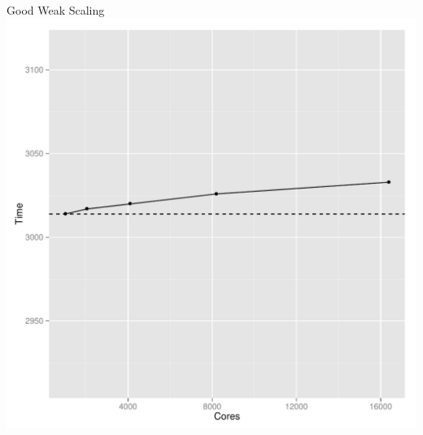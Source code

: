 \begin{frame}
\begin{center}
\begin{minipage}{.475\textwidth}
    \begin{block}{Good Weak Scaling}
      \centering
      \includegraphics[width=.95\textwidth]{../common/pics/scaling_weak}
    \end{block}
    \end{minipage}
    \end{center}
\end{frame}



